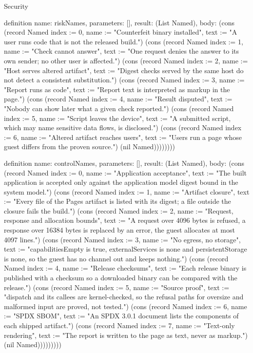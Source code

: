 \begin{lexlean}{Security}
\begin{semanticmodule}
definition{
  name: riskNames,
  parameters: [],
  result: (List Named),
  body: (cons (record Named {index := 0, name := "Counterfeit binary installed", text := "A user runs code that is not the released build."}) (cons (record Named {index := 1, name := "Check cannot answer", text := "One request denies the answer to its own sender; no other user is affected."}) (cons (record Named {index := 2, name := "Host serves altered artifact", text := "Digest checks served by the same host do not detect a consistent substitution."}) (cons (record Named {index := 3, name := "Report runs as code", text := "Report text is interpreted as markup in the page."}) (cons (record Named {index := 4, name := "Result disputed", text := "Nobody can show later what a given check reported."}) (cons (record Named {index := 5, name := "Script leaves the device", text := "A submitted script, which may name sensitive data flows, is disclosed."}) (cons (record Named {index := 6, name := "Altered artifact reaches users", text := "Users run a page whose guest differs from the proven source."}) (nil Named))))))))
}

definition{
  name: controlNames,
  parameters: [],
  result: (List Named),
  body: (cons (record Named {index := 0, name := "Application acceptance", text := "The built application is accepted only against the application model digest bound in the system model."}) (cons (record Named {index := 1, name := "Artifact closure", text := "Every file of the Pages artifact is listed with its digest; a file outside the closure fails the build."}) (cons (record Named {index := 2, name := "Request, response and allocation bounds", text := "A request over 4096 bytes is refused, a response over 16384 bytes is replaced by an error, the guest allocates at most 4097 lines."}) (cons (record Named {index := 3, name := "No egress, no storage", text := "capabilitiesEmpty is true, externalServices is none and persistentStorage is none, so the guest has no channel out and keeps nothing."}) (cons (record Named {index := 4, name := "Release checksums", text := "Each release binary is published with a checksum so a downloaded binary can be compared with the release."}) (cons (record Named {index := 5, name := "Source proof", text := "dispatch and its callees are kernel-checked, so the refusal paths for oversize and malformed input are proved, not tested."}) (cons (record Named {index := 6, name := "SPDX SBOM", text := "An SPDX 3.0.1 document lists the components of each shipped artifact."}) (cons (record Named {index := 7, name := "Text-only rendering", text := "The report is written to the page as text, never as markup."}) (nil Named)))))))))
}


\end{semanticmodule}
\end{lexlean}
